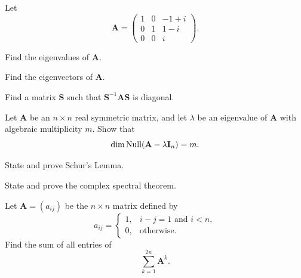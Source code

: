 \begin{problem}
Let
\[
\mathbf A=
\begin{pmatrix}
1&0&-1+i\\
0&1&1-i\\
0&0&i
\end{pmatrix}.
\]
\begin{problemsubparts}
\item Find the eigenvalues of $\mathbf A$.
\item Find the eigenvectors of $\mathbf A$.
\item Find a matrix $\mathbf S$ such that $\mathbf S^{-1}\mathbf A\mathbf S$ is diagonal.
\end{problemsubparts}
\end{problem}

\begin{problem}
Let $\mathbf A$ be an $n\times n$ real symmetric matrix, and let $\lambda$ be an eigenvalue of $\mathbf A$ with algebraic multiplicity $m$. Show that
\[
\dim\operatorname{Null}(\mathbf A-\lambda\mathbf I_n)=m.
\]
\end{problem}

\begin{problem}
\begin{problemchoices}
\item State and prove Schur's Lemma.
\item State and prove the complex spectral theorem.
\end{problemchoices}
\end{problem}

\begin{problem}
Let $\mathbf A=(a_{ij})$ be the $n\times n$ matrix defined by
\[
a_{ij}=
\begin{cases}
1, & i-j=1\text{ and }i<n,\\
0, & \text{otherwise}.
\end{cases}
\]
Find the sum of all entries of
\[
\sum_{k=1}^{2n}\mathbf A^k.
\]
\end{problem}

